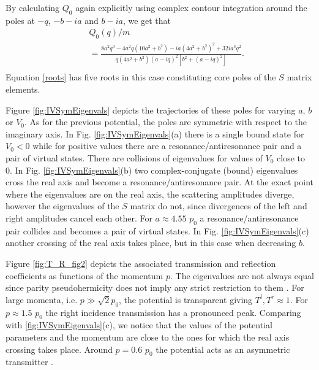 By calculating $Q_{0}$ again explicitly using complex contour integration around the poles at $-q$, $-b-i a$ and $b-i a$, we get that
%
\begin{eqnarray}
&&Q_{0}(q)/m
\nonumber\\
&&=\frac{8 a^2 q^3-4 a^2 q \left(10 a^2+b^2\right)-i a \left(4 a^2+b^2\right)^2+32 i a^3 q^2}{q \left(4 a^2+b^2\right) (a-i q)^2 \left[b^2+(a-i q)^2\right]}.
\nonumber\\
\end{eqnarray}
%
Equation \eqref{roots} has five roots in this case constituting core poles of the $S$ matrix elements.

Figure \ref{fig:IVSymEigenvals} depicts the trajectories of these poles for varying $a$, $b$ or $V_0$. As for the previous potential, the poles are symmetric with respect to the imaginary axis. In Fig. \ref{fig:IVSymEigenvals}(a) there is a single bound state for $V_0<0$ while for positive values there are a resonance/antiresonance pair and a pair of virtual states. There are collisions of eigenvalues for values of $V_0$ close to 0. In Fig. \ref{fig:IVSymEigenvals}(b)  two complex-conjugate (bound) eigenvalues cross the real axis and become a resonance/antiresonance pair. At the exact point where the eigenvalues are on the real axis, the scattering amplitudes diverge, however the eigenvalues of the $S$ matrix do not, since divergences of the left and right amplitudes cancel each other. For $a  \approx 4.55$ $p_0$ a resonance/antiresonance pair collides and becomes a pair of virtual states. In Fig. \ref{fig:IVSymEigenvals}(c) another crossing of the real axis takes place, but in this case when decreasing $b$.

Figure \ref{fig:T_R_fig2} depicts the associated transmission and reflection coefficients as functions of the momentum $p$. The eigenvalues are not always equal since parity pseudohermicity does not imply any strict restriction to them \cite{Ruschhaupt2017}. For large  momenta, i.e. $p \gg \sqrt{2} p_0$, the potential is transparent giving $T^l,T^r \approx 1$. For $p\approx 1.5$ $p_0$ the right incidence transmission has a pronounced peak. Comparing with \ref{fig:IVSymEigenvals}(c), we notice that the values of the potential parameters and the momentum are close to the ones for which the real axis crossing takes place. Around $p = 0.6$ $p_0$ the potential acts as an asymmetric transmitter
\cite{Ruschhaupt2017}.


